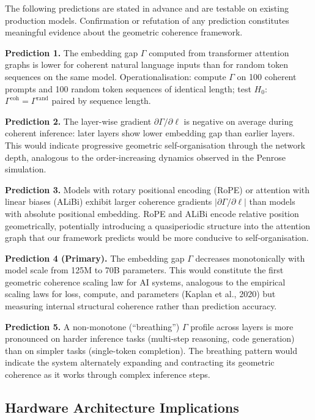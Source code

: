 \documentclass[11pt,a4paper]{article}
\begin{document}
The following predictions are stated in advance and are testable on existing production models. Confirmation or refutation of any prediction constitutes meaningful evidence about the geometric coherence framework.

\bigskip
\noindent\textbf{Prediction 1.} The embedding gap $\Gamma$ computed from transformer attention graphs is lower for coherent natural language inputs than for random token sequences on the same model. Operationalisation: compute $\Gamma$ on 100 coherent prompts and 100 random token sequences of identical length; test $H_0$: $\Gamma^{\text{coh}} = \Gamma^{\text{rand}}$ paired by sequence length.

\bigskip
\noindent\textbf{Prediction 2.} The layer-wise gradient $\partial\Gamma/\partial\ell$ is negative on average during coherent inference: later layers show lower embedding gap than earlier layers. This would indicate progressive geometric self-organisation through the network depth, analogous to the order-increasing dynamics observed in the Penrose simulation.

\bigskip
\noindent\textbf{Prediction 3.} Models with rotary positional encoding (RoPE) or attention with linear biases (ALiBi) exhibit larger coherence gradients $|\partial\Gamma/\partial\ell|$ than models with absolute positional embedding. RoPE and ALiBi encode relative position geometrically, potentially introducing a quasiperiodic structure into the attention graph that our framework predicts would be more conducive to self-organisation.

\bigskip
\noindent\textbf{Prediction 4 (Primary).} The embedding gap $\Gamma$ decreases monotonically with model scale from 125M to 70B parameters. This would constitute the first geometric coherence scaling law for AI systems, analogous to the empirical scaling laws for loss, compute, and parameters (Kaplan et al., 2020) but measuring internal structural coherence rather than prediction accuracy.

\bigskip
\noindent\textbf{Prediction 5.} A non-monotone (``breathing'') $\Gamma$ profile across layers is more pronounced on harder inference tasks (multi-step reasoning, code generation) than on simpler tasks (single-token completion). The breathing pattern would indicate the system alternately expanding and contracting its geometric coherence as it works through complex inference steps.

\subsection{Hardware Architecture Implications}
\end{document}
